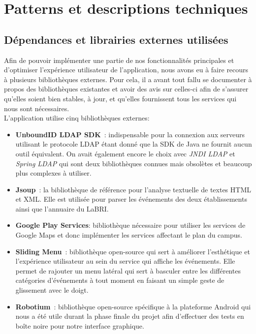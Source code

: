 \chapter{Patterns et descriptions techniques}

\section{Dépendances et librairies externes utilisées}

Afin de pouvoir implémenter une partie de nos fonctionnalités principales et d'optimiser l'expérience utilisateur de l'application, nous avons eu à faire recours à plusieurs bibliothèques externes. Pour cela, il a avant tout fallu se documenter à propos des bibliothèques existantes et avoir des avis sur celles-ci afin de s'assurer qu'elles soient bien stables, à jour, et qu'elles fournissent tous les services qui nous sont nécessaires.\\

L'application utilise cinq bibliothèques externes: \\

\begin{itemize}
\renewcommand{\labelitemi}{$\bullet$}
\item \textbf{UnboundID LDAP SDK}~\cite{unboundId}: indispensable pour la connexion aux serveurs utilisant le protocole LDAP étant donné que la SDK de Java ne fournit aucun outil équivalent. On avait également encore le choix avec \textit{JNDI LDAP} et \textit{Spring LDAP} qui sont deux bibliothèques connues mais obsolètes et beaucoup plus complexes à utiliser. \\
\item \textbf{Jsoup}~\cite{jsoup}: la bibliothèque de référence pour l'analyse textuelle de textes HTML et XML. Elle est utilisée pour parser les événements des deux établissements ainsi que l'annuaire du LaBRI. \\
\item \textbf{Google Play Services}: bibliothèque nécessaire pour utiliser les services de Google Maps et donc implémenter les services affectant le plan du campus. \\
\item \textbf{Sliding Menu}~\cite{slidingMenu}: bibliothèque open-source qui sert à améliorer l'esthétique et l'expérience utilisateur au sein du service qui affiche les événements. Elle permet de rajouter un menu latéral qui sert à basculer entre les différentes catégories d'événements à tout moment en faisant un simple geste de glissement avec le doigt. \\
\item \textbf{Robotium}~\cite{robotium}: bibliothèque open-source spécifique à la plateforme Android qui nous a été utile durant la phase finale du projet afin d'effectuer des tests en boîte noire pour notre interface graphique. 
\end{itemize}

